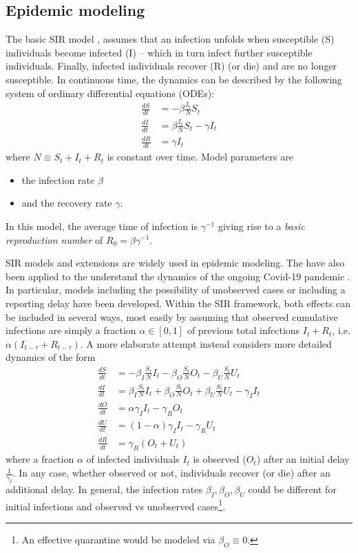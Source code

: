 \documentclass[fullpage,a4paper]{article}
\begin{document}
\subsection{Epidemic modeling}
The basic SIR model \cite{Newman}, assumes that an infection unfolds when
susceptible (S) individuals become infected (I) -- which in turn
infect further susceptible individuals. Finally, infected individuals
recover (R) (or die) and are no longer susceptible. In continuous
time, the dynamics can be described by the following system of
ordinary differential equations (ODEs):
\begin{align*}
  \frac{dS}{dt} &= - \beta \frac{I_t}{N} S_t \\
  \frac{dI}{dt} &= \beta \frac{I_t}{N} S_t - \gamma I_t \\
  \frac{dR}{dt} &= \gamma I_t
\end{align*}
where $N \equiv S_t + I_t + R_t$ is constant over time. Model
parameters are
\begin{itemize}
\item the infection rate $\beta$
\item and the recovery rate $\gamma$.
\end{itemize}
In this model, the average time of infection is $\gamma^{-1}$ giving
rise to a {\em basic reproduction number} of $R_0 = \beta
\gamma^{-1}$.

SIR models and extensions are widely used in epidemic modeling. The
have also been applied to the understand the dynamics of the ongoing
Covid-19 pandemic
\cite{arxiv:2002.07572,arxiv:2004.01105,10.1126/science.abb3221,https://www.medrxiv.org/content/10.1101/2020.02.27.20028639v2}.
In particular, models including the possibility of unobserved cases or
including a reporting delay have been developed. Within the SIR
framework, both effects can be included in several ways, most easily
by assuming that observed cumulative infections are simply a fraction
$\alpha \in [0, 1]$ of previous total infections $I_t + R_t$,
i.e. $\alpha (I_{t - \tau} + R_{t - \tau})$. A more elaborate attempt
instead considers more detailed dynamics of the form
\begin{align*}
  \frac{dS}{dt} &= - \beta_I \frac{S_t}{N} I_t - \beta_O \frac{S_t}{N} O_t - \beta_U \frac{S_t}{N} U_t \\
  \frac{dI}{dt} &= \beta_I \frac{S_t}{N} I_t + \beta_O \frac{S_t}{N} O_t + \beta_U \frac{S_t}{N} U_t - \gamma_I I_t \\
  \frac{dO}{dt} &= \alpha \gamma_I I_t - \gamma_R O_t \\
  \frac{dU}{dt} &= (1 - \alpha) \gamma_I I_t - \gamma_R U_t \\
  \frac{dR}{dt} &= \gamma_R (O_t + U_t)
\end{align*}
where a fraction $\alpha$ of infected individuals $I_t$ is observed
($O_t$) after an initial delay $\frac{1}{\gamma_I}$. In any case,
whether observed or not, individuals recover (or die) after an
additional delay. In general, the infection rates $\beta_I, \beta_O,
\beta_U$ could be different for initial infections and observed vs
unobserved cases\footnote{An effective quarantine would be modeled via
  $\beta_O \equiv 0$.}.
\end{document}
